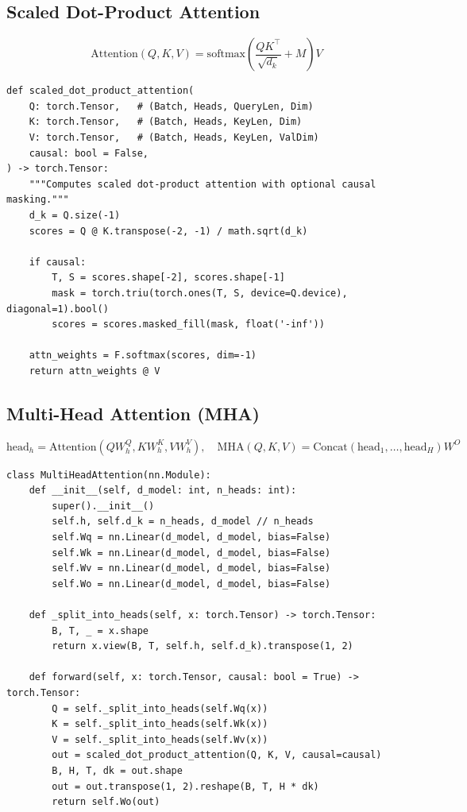 \subsection{Scaled Dot-Product Attention}
\label{form:sdpa}

\[
  \mathrm{Attention}(Q, K, V) = \mathrm{softmax}\!\left(\frac{Q K^\top}{\sqrt{d_k}} + M\right) V
\]

\begin{lstlisting}[style=pythonstyle, caption={Scaled dot-product attention}, label=lst:sdpa]
def scaled_dot_product_attention(
    Q: torch.Tensor,   # (Batch, Heads, QueryLen, Dim)
    K: torch.Tensor,   # (Batch, Heads, KeyLen, Dim)
    V: torch.Tensor,   # (Batch, Heads, KeyLen, ValDim)
    causal: bool = False,
) -> torch.Tensor:
    """Computes scaled dot-product attention with optional causal masking."""
    d_k = Q.size(-1)
    scores = Q @ K.transpose(-2, -1) / math.sqrt(d_k)
    
    if causal:
        T, S = scores.shape[-2], scores.shape[-1]
        mask = torch.triu(torch.ones(T, S, device=Q.device), diagonal=1).bool()
        scores = scores.masked_fill(mask, float('-inf'))
        
    attn_weights = F.softmax(scores, dim=-1)
    return attn_weights @ V
\end{lstlisting}

\subsection{Multi-Head Attention (MHA)}
\label{form:mha}

\[
  \mathrm{head}_h = \mathrm{Attention}(Q W_h^Q, K W_h^K, V W_h^V), \quad
  \mathrm{MHA}(Q, K, V) = \mathrm{Concat}(\mathrm{head}_1, \dots, \mathrm{head}_H) W^O
\]

\begin{lstlisting}[style=pythonstyle, caption={Multi-head attention}, label=lst:mha]
class MultiHeadAttention(nn.Module):
    def __init__(self, d_model: int, n_heads: int):
        super().__init__()
        self.h, self.d_k = n_heads, d_model // n_heads
        self.Wq = nn.Linear(d_model, d_model, bias=False)
        self.Wk = nn.Linear(d_model, d_model, bias=False)
        self.Wv = nn.Linear(d_model, d_model, bias=False)
        self.Wo = nn.Linear(d_model, d_model, bias=False)

    def _split_into_heads(self, x: torch.Tensor) -> torch.Tensor:
        B, T, _ = x.shape
        return x.view(B, T, self.h, self.d_k).transpose(1, 2)

    def forward(self, x: torch.Tensor, causal: bool = True) -> torch.Tensor:
        Q = self._split_into_heads(self.Wq(x))
        K = self._split_into_heads(self.Wk(x))
        V = self._split_into_heads(self.Wv(x))
        out = scaled_dot_product_attention(Q, K, V, causal=causal)
        B, H, T, dk = out.shape
        out = out.transpose(1, 2).reshape(B, T, H * dk)
        return self.Wo(out)
\end{lstlisting}


